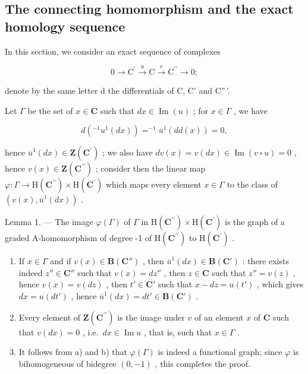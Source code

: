 \subsection{The connecting homomorphism and the exact homology sequence}

In this section, we consider an exact sequence of complexes

\[
0 \longrightarrow \mathrm{C} ^ {\prime} \stackrel {u} {\longrightarrow} \mathrm{C} \stackrel {v} {\longrightarrow} \mathrm{C} ^ {\prime \prime} \longrightarrow 0;
\]

denote by the same letter d the differentials of C, C' and C''\,'.

Let \(\Gamma\) be the set of \(x \in \mathbf{C}\) such that \(dx \in \operatorname{Im}(u)\) ; for \(x \in \Gamma\) , we have

\[
d \left(^ {- 1} u ^ {1} (d x)\right) = ^ {- 1} u ^ {1} (d d (x)) = 0,
\]

hence \(\overline{u}^{1}(dx)\in\mathbf{Z}(\mathbf{C}^{\prime})\) ; we also have \(dv(x)=v(dx)\in\operatorname{Im}(v\circ u)=0\) , hence \(v(x)\in\mathbf{Z}(\mathbf{C}^{\prime\prime})\) ; consider then the linear map \(\varphi:\Gamma\to\mathrm{H}(\mathbf{C}^{\prime\prime})\times\mathrm{H}(\mathbf{C}^{\prime})\) which maps every element \(x\in\Gamma\) to the class of \((v(x),\overline{u}^{1}(dx))\) .

Lemma 1. --- The image \(\varphi(\Gamma)\) of \(\Gamma\) in \(\mathrm{H}(\mathbf{C}^{\prime\prime}) \times \mathrm{H}(\mathbf{C}^{\prime})\) is the graph of a graded A-homomorphism of degree -1 of \(\mathrm{H}(\mathbf{C}^{\prime\prime})\) to \(\mathrm{H}(\mathbf{C}^{\prime})\) .

\begin{enumerate}
\def\labelenumi{\alph{enumi})}
\item
  If \(x \in \Gamma\) and if \(v(x) \in \mathbf{B}(\mathbf{C}'')\) , then \(\bar{u}^1(dx) \in \mathbf{B}(\mathbf{C}')\) : there exists indeed \(z'' \in \mathbf{C}''\) such that \(v(x) = dz''\) , then \(z \in \mathbf{C}\) such that \(z'' = v(z)\) , hence \(v(x) = v(dz)\) , then \(t' \in \mathbf{C}'\) such that \(x - dz = u(t')\) , which gives \(dx = u(dt')\) , hence \(\bar{u}^1(dx) = dt' \in \mathbf{B}(\mathbf{C}')\) .
\item
  Every element of \(\mathbf{Z}(\mathbf{C}^{\prime \prime})\) is the image under \(v\) of an element \(x\) of \(\mathbf{C}\) such that \(v(dx) = 0\) , i.e.~\(dx \in \operatorname{Im} u\) , that is, such that \(x \in \Gamma\) .
\item
  It follows from a) and b) that \(\varphi(\Gamma)\) is indeed a functional graph; since \(\varphi\) is bihomogeneous of bidegree \((0, -1)\) , this completes the proof.
\end{enumerate}

